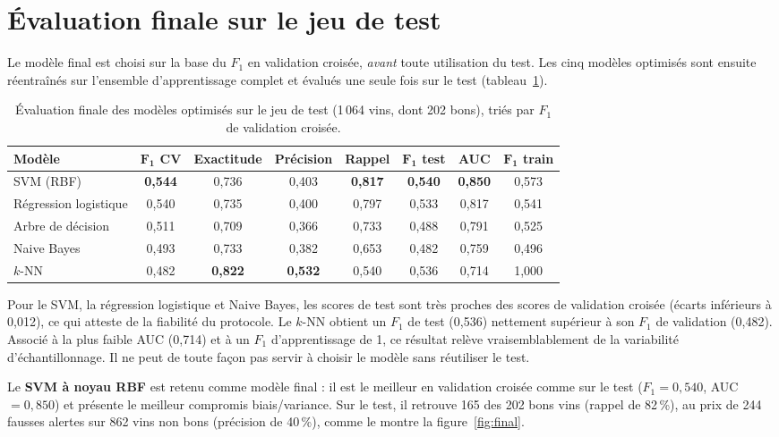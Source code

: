 \documentclass[11pt,a4paper]{article}
\newcommand{\Fun}{F_1}
\begin{document}
\section{Évaluation finale sur le jeu de test}\label{sec:final}

Le modèle final est choisi sur la base du $\Fun$ en validation croisée, \emph{avant} toute utilisation du test. Les cinq modèles optimisés sont ensuite réentraînés sur l'ensemble d'apprentissage complet et évalués une seule fois sur le test (tableau~\ref{tab:test}).

\begin{table}[H]
\centering
\caption{Évaluation finale des modèles optimisés sur le jeu de test (1\,064 vins, dont 202 bons), triés par $\Fun$ de validation croisée.}
\label{tab:test}
\small
\begin{tabular}{lccccccc}
\toprule
\textbf{Modèle} & $\boldsymbol{\Fun}$ \textbf{CV} & \textbf{Exactitude} & \textbf{Précision} & \textbf{Rappel} & $\boldsymbol{\Fun}$ \textbf{test} & \textbf{AUC} & $\boldsymbol{\Fun}$ \textbf{train} \\
\midrule
SVM (RBF)             & \textbf{0,544} & 0,736 & 0,403 & \textbf{0,817} & \textbf{0,540} & \textbf{0,850} & 0,573 \\
Régression logistique & 0,540 & 0,735 & 0,400 & 0,797 & 0,533 & 0,817 & 0,541 \\
Arbre de décision     & 0,511 & 0,709 & 0,366 & 0,733 & 0,488 & 0,791 & 0,525 \\
Naive Bayes           & 0,493 & 0,733 & 0,382 & 0,653 & 0,482 & 0,759 & 0,496 \\
$k$-NN                & 0,482 & \textbf{0,822} & \textbf{0,532} & 0,540 & 0,536 & 0,714 & 1,000 \\
\bottomrule
\end{tabular}
\end{table}

Pour le SVM, la régression logistique et Naive Bayes, les scores de test sont très proches des scores de validation croisée (écarts inférieurs à 0,012), ce qui atteste de la fiabilité du protocole. Le $k$-NN obtient un $\Fun$ de test (0,536) nettement supérieur à son $\Fun$ de validation (0,482). Associé à la plus faible AUC (0,714) et à un $\Fun$ d'apprentissage de 1, ce résultat relève vraisemblablement de la variabilité d'échantillonnage. Il ne peut de toute façon pas servir à choisir le modèle sans réutiliser le test.

Le \textbf{SVM à noyau RBF} est retenu comme modèle final : il est le meilleur en validation croisée comme sur le test ($\Fun = 0{,}540$, AUC $= 0{,}850$) et présente le meilleur compromis biais/variance. Sur le test, il retrouve 165 des 202 bons vins (rappel de 82\,\%), au prix de 244 fausses alertes sur 862 vins non bons (précision de 40\,\%), comme le montre la figure~\ref{fig:final}.
\end{document}
